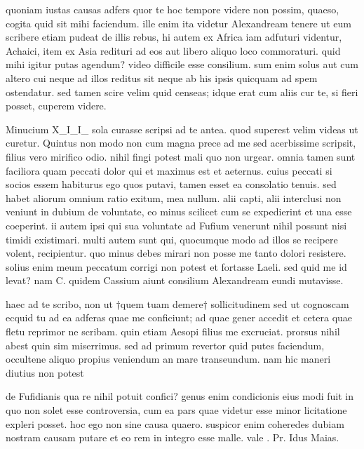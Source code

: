 


 quoniam iustas causas adfers quor te hoc tempore videre non possim, quaeso, cogita quid sit mihi faciendum. ille enim ita videtur Alexandream tenere ut eum scribere etiam pudeat de illis rebus, hi autem ex Africa iam adfuturi videntur, Achaici, item ex Asia redituri ad eos aut libero aliquo loco commoraturi. quid mihi igitur putas agendum? video difficile esse consilium. sum enim solus aut cum altero cui neque ad illos reditus sit neque ab his ipsis quicquam ad spem ostendatur. sed tamen scire velim quid censeas; idque erat cum aliis cur te, si fieri posset, cuperem videre.

 Minucium X_I_I_ sola curasse scripsi ad te antea. quod superest velim videas ut curetur. Quintus non modo non cum magna prece ad me sed acerbissime scripsit, filius vero mirifico odio. nihil fingi potest mali quo non urgear. omnia tamen sunt faciliora quam peccati dolor qui et maximus est et aeternus. cuius peccati si socios essem habiturus ego quos putavi, tamen esset ea consolatio tenuis. sed habet aliorum omnium ratio exitum, mea nullum. alii capti, alii interclusi non veniunt in dubium de voluntate, eo minus scilicet cum se expedierint et una esse coeperint. ii autem ipsi qui sua voluntate ad Fufium venerunt nihil possunt nisi timidi existimari. multi autem sunt qui, quocumque modo ad illos se recipere volent, recipientur. quo minus debes mirari non posse me tanto dolori resistere. solius enim meum peccatum corrigi non potest et fortasse Laeli. sed quid me id levat? nam C. quidem Cassium aiunt consilium Alexandream eundi mutavisse.

 haec ad te scribo, non ut †quem tuam demere† sollicitudinem sed ut cognoscam ecquid tu ad ea adferas quae me conficiunt; ad quae gener accedit et cetera quae fletu reprimor ne scribam. quin etiam Aesopi filius me excruciat. prorsus nihil abest quin sim miserrimus. sed ad primum revertor quid putes faciendum, occultene aliquo propius veniendum an mare transeundum. nam hic maneri diutius non potest

 de Fufidianis qua re nihil potuit confici? genus enim condicionis eius modi fuit in quo non solet esse controversia, cum ea pars quae videtur esse minor licitatione expleri posset. hoc ego non sine causa quaero. suspicor enim coheredes dubiam nostram causam putare et eo rem in integro esse malle. vale . Pr. Idus Maias.
